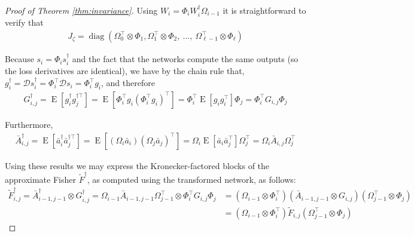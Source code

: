 \documentclass[12pt]{article}
\newcommand{\expected}{\operatorname{E}}
\newcommand{\deriv}{\mathcal{D}}
\newcommand{\diag}{\operatorname{diag}}
\begin{document}
\begin{proof}[Proof of Theorem \ref{thm:invariance}]
Using $W_i = \Phi_i W^\dagger_i \Omega_{i-1}$ it is straightforward to verify that
\begin{align*}
J_\zeta = \diag( \Omega_0^\top \otimes \Phi_1, \Omega_1^\top \otimes \Phi_2, \: \ldots, \: \Omega_{\ell-1}^\top \otimes \Phi_\ell )
\end{align*}

Because $s_i = \Phi_i s^\dagger_i$ and the fact that the networks compute the same outputs (so the loss derivatives are identical), we have by the chain rule that, $g_i^\dagger = \deriv s^\dagger_i = \Phi_i^\top \deriv s_i = \Phi_i^\top g_i$, and therefore
\begin{align*}
G_{i,j}^\dagger = \expected \left[ g_i^\dagger g_j^{\dagger\top} \right] = \expected \left[ \Phi_i^\top g_i (\Phi_i^\top g_i)^\top \right] = \Phi_i^\top \expected \left[ g_i g_i^\top \right] \Phi_j = \Phi_i^\top G_{i,j} \Phi_j
\end{align*}

Furthermore,
\begin{align*}
\bar{A}_{i,j}^\dagger = \expected \left[ \bar{a}_i^\dagger \bar{a}_j^{\dagger\top} \right] = \expected \left[ (\Omega_i \bar{a}_i) (\Omega_j \bar{a}_j)^\top \right] = \Omega_i \expected \left[ \bar{a}_i \bar{a}_j^\top \right] \Omega_j^\top = \Omega_i \bar{A}_{i,j} \Omega_j^\top
\end{align*}

Using these results we may express the Kronecker-factored blocks of the approximate Fisher $\tilde{F}^\dagger$, as computed using the transformed network, as follows:
\begin{align*}
\tilde{F}^\dagger_{i,j} = \bar{A}^\dagger_{i-1,j-1} \otimes G^\dagger_{i,j} = \Omega_{i-1} \bar{A}_{i-1,j-1} \Omega_{j-1}^\top
 \otimes \Phi_i^\top G_{i,j} \Phi_j &= (\Omega_{i-1} \otimes \Phi_i^\top)(\bar{A}_{i-1,j-1} \otimes G_{i,j})(\Omega_{j-1}^\top \otimes \Phi_j) \\
&= (\Omega_{i-1} \otimes \Phi_i^\top) \tilde{F}_{i,j} (\Omega_{j-1}^\top \otimes \Phi_j)
\end{align*}



\end{proof}
\end{document}
